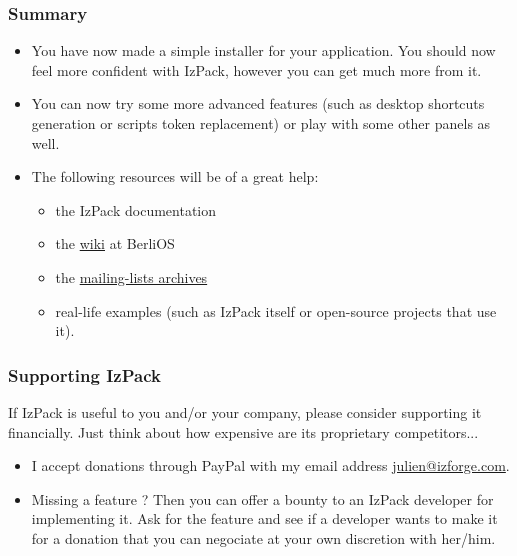 \documentclass[compress,10pt]{beamer}
\begin{document}
\begin{frame}

\frametitle{Summary}

\begin{itemize}

  \item You have now made a simple installer for your application. You should
  now feel more confident with IzPack, however you can get much more from it.

  \item You can now try some more advanced features (such as desktop shortcuts
  generation or scripts token replacement) or play with some other panels as
  well.

  \item The following resources will be of a great help:
  \begin{itemize}

    \item the IzPack documentation

    \item the \href{http://openfacts.berlios.de/index-en.phtml?title=IzPack}{
    wiki} at BerliOS

    \item the \href{http://developer.berlios.de/mail/?group_id=1408}{
    mailing-lists archives}

    \item real-life examples (such as IzPack itself or open-source projects that
    use it).

  \end{itemize}

\end{itemize}

\end{frame}

\begin{frame}

\frametitle{Supporting IzPack}

If IzPack is useful to you and/or your company, please consider supporting it
financially. Just think about how expensive are its proprietary competitors...

\begin{itemize}

  \item I accept donations through PayPal with my email address
  \small{\url{julien@izforge.com}}.

  \item Missing a feature ? Then you can offer a bounty to an IzPack developer
  for implementing it. Ask for the feature and see if a developer wants to make
  it for a donation that you can negociate at your own discretion with her/him.

\end{itemize}

\end{frame}
\end{document}
